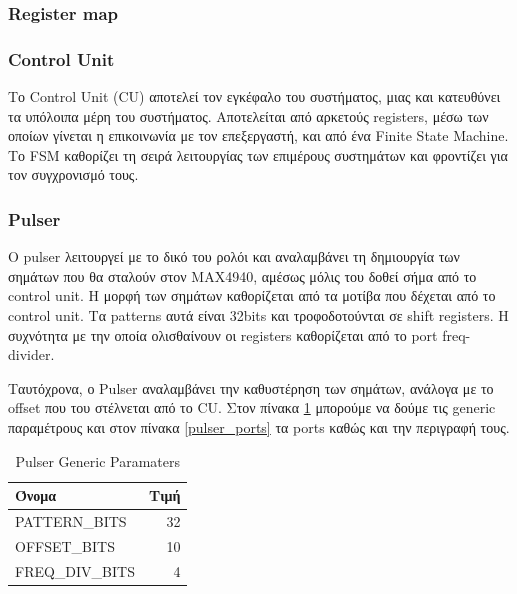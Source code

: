 \documentclass[12pt,a4paper]{book}
\begin{document}
\subsubsection{Register map}



\subsubsection{Control Unit}
Το Control Unit (CU) αποτελεί τον εγκέφαλο του συστήματος, μιας και κατευθύνει τα υπόλοιπα μέρη του συστήματος. Αποτελείται από αρκετούς registers, μέσω των οποίων γίνεται η επικοινωνία με τον επεξεργαστή, και από ένα Finite State Machine. Το FSM καθορίζει τη σειρά λειτουργίας των επιμέρους συστημάτων και φροντίζει για τον συγχρονισμό τους.



\subsubsection{Pulser}
O pulser λειτουργεί με το δικό του ρολόι και αναλαμβάνει τη δημιουργία των σημάτων που θα σταλούν στον MAX4940, αμέσως μόλις του δοθεί σήμα από το control unit. Η μορφή των σημάτων καθορίζεται από τα μοτίβα που δέχεται από το control unit. Τα patterns αυτά είναι 32bits και τροφοδοτούνται σε shift registers. Η συχνότητα με την οποία ολισθαίνουν οι registers καθορίζεται από το port freq-divider. 

Ταυτόχρονα, ο Pulser  αναλαμβάνει την καθυστέρηση των σημάτων, ανάλογα με το offset που του στέλνεται από το CU. Στον πίνακα \ref{pulser_generics} μπορούμε να δούμε τις generic παραμέτρους και στον πίνακα \ref{pulser_ports} τα ports καθώς και την περιγραφή τους.

\begin{table}
\center
\begin{tabular}{|l|r|}
\hline 
Όνομα & Τιμή \\ 
\hline 
PATTERN\_BITS & 32 \\ 
\hline 
OFFSET\_BITS & 10 \\ 
\hline 
FREQ\_DIV\_BITS & 4 \\ 
\hline 
\end{tabular} 
\caption{Pulser Generic Paramaters}
\label{pulser_generics} 
\end{table} 
\end{document}
